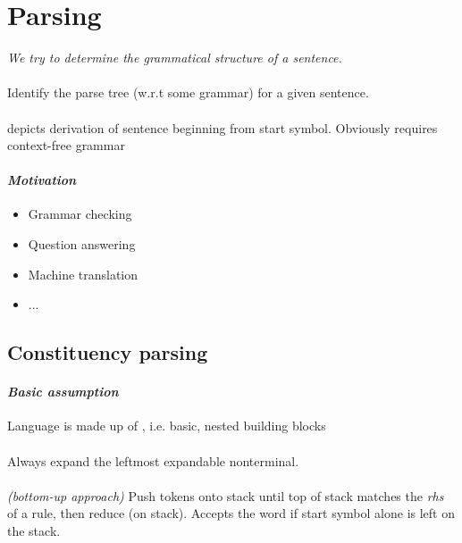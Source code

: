 \documentclass[10pt,twocolumn]{article}
\begin{document}
\section{Parsing}

\textit{We try to determine the grammatical structure of a sentence.}

\paragraph{} Identify the parse tree (w.r.t some grammar)
for a given sentence. 

\paragraph{} depicts derivation of sentence beginning from start
symbol. Obviously requires context-free grammar 

\paragraph{\textit{Motivation}}
\begin{itemize}
\item Grammar checking
\item Question answering
\item Machine translation
\item ...
\end{itemize}

\subsection{Constituency parsing}

\paragraph{\textit{Basic assumption}} Language is made up of ,
i.e. basic, nested building blocks 

\paragraph{} Always expand the leftmost expandable
nonterminal.

\paragraph{} \textit{(bottom-up approach)} Push tokens
onto stack until top of stack matches the \textit{rhs} of a rule, then reduce
(on stack). Accepts the word if start symbol alone is left on the stack.
\end{document}
